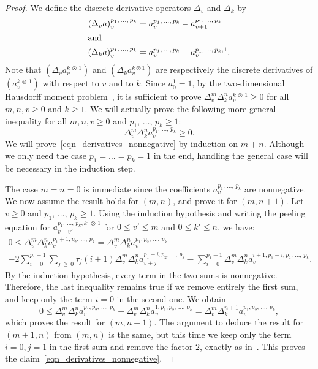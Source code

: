 \documentclass[10pt]{amsart}
\theoremstyle{definition}\newtheorem{defi}[theo]{Definition}\newtheorem{rema}[theo]{Remark}\newtheorem{exam}[theo]{Example}\newtheorem{exem}[theo]{Example}\newtheorem{nota}[theo]{Notation}
\begin{document}
\begin{proof}
We define the discrete derivative operators $\Delta_v$ and $\Delta_k$ by
\begin{align*}
\left(\Delta_v a \right)_v^{p_1,\, \dots,\,p_k} &= a^{p_1,\,\dots,\,p_k}_v - a^{p_1,\,\dots,\,p_k}_{v+1}
\\
\intertext{and}
\left(\Delta_k a \right)_v^{p_1,\,\dots,\,p_k} &= a^{p_1,\,\dots,\,p_k}_v - a^{p_1,\,\dots,\,p_k,1}_{v}.
\end{align*}
Note that $(\Delta_v a^{k\, \otimes\,1}_v)$ and $(\Delta_k a^{k \otimes 1}_v)$ are respectively the discrete derivatives of $(a^{k\,\otimes\,1}_v )$ with respect to $v$ and to $k$. Since $a_0^1=1$, by the two-dimensional Hausdorff moment problem~\cite{HS33}, it is sufficient to prove $\Delta_v^{m} \Delta_k^n a_v^{k\,\otimes\,1} \geq 0$ for all $m,n,v \geq 0$ and $k \geq 1$. We will actually prove the following more general inequality for all $m,n,v \geq 0$ and $p_1,\,\dots,\,p_k \geq 1$:
\begin{equation}\label{eqn_derivatives_nonnegative}
\Delta_v^m \Delta_k^n a_v^{p_1,\,\dots,\,p_k} \geq 0.
\end{equation}
We will prove~\eqref{eqn_derivatives_nonnegative} by induction on $m+n$. Although we only need the case $p_1=\dots=p_k=1$ in the end, handling the general case will be necessary in the induction step.

The case $m=n=0$ is immediate since the coefficients $a_v^{p_1,\,\dots,\,p_k}$ are nonnegative. We now assume the result holds for $(m,n)$, and prove it for $(m,n+1)$. Let $v \geq 0$ and $p_1,\,\dots,\,p_k \geq 1$. Using the induction hypothesis and writing the peeling equation for $a_{v+v'}^{p_1,\,\dots,\,p_k, k' \,\otimes\,1}$ for $0 \leq v' \leq m$ and $0 \leq k' \leq n$, we have:
\begin{multline*}
0  \leq \Delta^m_v \Delta_k^n a_v^{p_1+1, p_2, \,\dots,\,p_k}
= \Delta^m_v \Delta_k^n a_v^{p_1, p_2,\,\dots, \,p_k} \\-2 \sum_{i=0}^{p_1-1} \sum_{j\,\geq\,0} \tau_j(i+1) \Delta^m_v \Delta_k^n a_{v+j}^{p_1-i, p_2,\,\dots,\,p_k} - \sum_{i=0}^{p_1-1} \Delta^m_v \Delta_k^n a_v^{i+1, p_1-i, p_2,\,\dots,\,p_k}.
\end{multline*}
By the induction hypothesis, every term in the two sums is nonnegative. Therefore, the last inequality remains true if we remove entirely the first sum, and keep only the term $i=0$ in the second one. We obtain
\[
0 \leq \Delta^m_v \Delta_k^n a_v^{p_1, p_2,\, \dots,\,p_k} - \Delta^m_v \Delta_k^n a_v^{1, p_1, p_2,\,\dots,\,p_k} = \Delta^m_v \Delta_k^{n+1} a_v^{p_1, p_2,\,\dots,\,p_k},
\]
which proves the result for $(m,n+1)$. The argument to deduce the result for $(m+1,n)$ from $(m,n)$ is the same, but this time we keep only the term $i=0, j=1$ in the first sum and remove the factor $2$, exactly as in~\cite[Lemma~16]{BL19}. This proves the claim~\eqref{eqn_derivatives_nonnegative}.


\end{proof}
\end{document}
